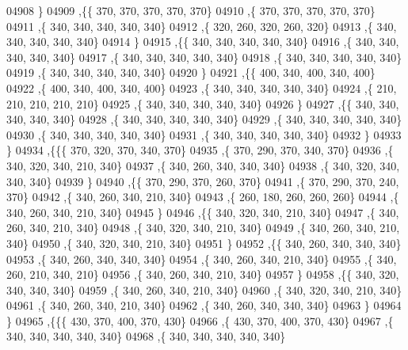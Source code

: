 \begin{DoxyCode}
04908     \}
04909    ,\{\{   370,   370,   370,   370,   370\}
04910     ,\{   370,   370,   370,   370,   370\}
04911     ,\{   340,   340,   340,   340,   340\}
04912     ,\{   320,   260,   320,   260,   320\}
04913     ,\{   340,   340,   340,   340,   340\}
04914     \}
04915    ,\{\{   340,   340,   340,   340,   340\}
04916     ,\{   340,   340,   340,   340,   340\}
04917     ,\{   340,   340,   340,   340,   340\}
04918     ,\{   340,   340,   340,   340,   340\}
04919     ,\{   340,   340,   340,   340,   340\}
04920     \}
04921    ,\{\{   400,   340,   400,   340,   400\}
04922     ,\{   400,   340,   400,   340,   400\}
04923     ,\{   340,   340,   340,   340,   340\}
04924     ,\{   210,   210,   210,   210,   210\}
04925     ,\{   340,   340,   340,   340,   340\}
04926     \}
04927    ,\{\{   340,   340,   340,   340,   340\}
04928     ,\{   340,   340,   340,   340,   340\}
04929     ,\{   340,   340,   340,   340,   340\}
04930     ,\{   340,   340,   340,   340,   340\}
04931     ,\{   340,   340,   340,   340,   340\}
04932     \}
04933    \}
04934   ,\{\{\{   370,   320,   370,   340,   370\}
04935     ,\{   370,   290,   370,   340,   370\}
04936     ,\{   340,   320,   340,   210,   340\}
04937     ,\{   340,   260,   340,   340,   340\}
04938     ,\{   340,   320,   340,   340,   340\}
04939     \}
04940    ,\{\{   370,   290,   370,   260,   370\}
04941     ,\{   370,   290,   370,   240,   370\}
04942     ,\{   340,   260,   340,   210,   340\}
04943     ,\{   260,   180,   260,   260,   260\}
04944     ,\{   340,   260,   340,   210,   340\}
04945     \}
04946    ,\{\{   340,   320,   340,   210,   340\}
04947     ,\{   340,   260,   340,   210,   340\}
04948     ,\{   340,   320,   340,   210,   340\}
04949     ,\{   340,   260,   340,   210,   340\}
04950     ,\{   340,   320,   340,   210,   340\}
04951     \}
04952    ,\{\{   340,   260,   340,   340,   340\}
04953     ,\{   340,   260,   340,   340,   340\}
04954     ,\{   340,   260,   340,   210,   340\}
04955     ,\{   340,   260,   210,   340,   210\}
04956     ,\{   340,   260,   340,   210,   340\}
04957     \}
04958    ,\{\{   340,   320,   340,   340,   340\}
04959     ,\{   340,   260,   340,   210,   340\}
04960     ,\{   340,   320,   340,   210,   340\}
04961     ,\{   340,   260,   340,   210,   340\}
04962     ,\{   340,   260,   340,   340,   340\}
04963     \}
04964    \}
04965   ,\{\{\{   430,   370,   400,   370,   430\}
04966     ,\{   430,   370,   400,   370,   430\}
04967     ,\{   340,   340,   340,   340,   340\}
04968     ,\{   340,   340,   340,   340,   340\}

\end{DoxyCode}
